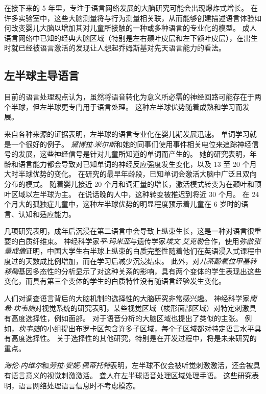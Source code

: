 在接下来的 5 年里，专注于语言网络发展的大脑研究可能会出现爆炸式增长。
在许多实验室中，这些大脑测量将与行为测量相关联，从而能够创建描述语言体验如何改变婴儿大脑以增加其对儿童所接触的一种或多种语言的专业化的模型。
成人语言网络中已知的经典大脑区域（特别是左右颞叶皮层和左下额叶皮层），在出生时就已经被语言激活的发现让人想起乔姆斯基对先天语言能力的看法。



\subsection{左半球主导语言}

目前的语言处理观点认为，虽然将语音转化为意义所必需的神经回路可能存在于两个半球，但左半球更专门用于语言处理。
这种左半球优势随着成熟和学习而发展。


来自各种来源的证据表明，左半球的语言专业化在婴儿期发展迅速。
单词学习就是一个很好的例子。
\textit{黛博拉$\cdot$米尔斯}和她的同事们使用事件相关电位来追踪神经信号的发展，这些神经信号是针对儿童所知道的单词而产生的。
她的研究表明，年龄和语言能力都会导致对已知单词的神经反应强度发生变化，以及 13 至 20 个月大时半球优势的变化。
在研究的最早年龄段，已知单词会激活大脑中广泛且双向分布的模式。
随着婴儿接近 20 个月和词汇量的增长，激活模式转变为在颞叶和顶叶区域以左半球为主。
在说话晚的人中，这种转变被推迟到将近 30 个月。
在 24 个月大的孤独症儿童中，这种左半球优势的明显程度预示着儿童在 6 岁时的语言、认知和适应能力。


几项研究表明，成年后沉浸在第二语言中会导致上纵束生长，这是一种对语言很重要的白质纤维束。
神经科学家\textit{平$\cdot$玛米亚}与遗传学家\textit{埃文$\cdot$艾克勒}合作，使用\textit{弥散张量成像}证明，中国大学生右半球上纵束的白质完整性随着他们在英语浸入式课程中度过的天数成比例增加，而在学习后减少沉浸结束。
此外，对\textit{儿茶酚氧位甲基转移酶}基因多态性的分析显示了对这种关系的影响，具有两个变体的学生表现出这些变化，而具有第三个变体的学生的白质特性没有随语言经验发生变化。


人们对调查语言背后的大脑机制的选择性的大脑研究非常感兴趣。
神经科学家\textit{南希$\cdot$坎韦施}对视觉系统的研究表明，某些视觉区域（梭形面部区域）对特定刺激具有高度选择性，例如面部。
对于语音分析的大脑区域也提出了类似的主张。
例如，\textit{坎韦施}的小组提出布罗卡区包含许多子区域，每个子区域都对特定语言水平具有高度选择性。
关于选择性的其他研究，特别是在开发过程中，将是未来研究的重点。


\textit{海伦$\cdot$内维尔}和\textit{劳拉$\cdot$安妮$\cdot$佩蒂托特}表明，左半球不仅会被听觉刺激激活，还会被具有语言意义的视觉刺激激活。
聋人在左半球语音处理区域处理手语。
这些研究表明，语言网络处理语言信息时不考虑模态。



